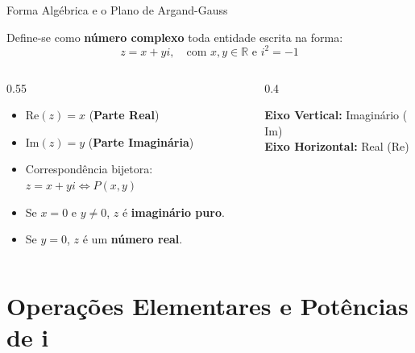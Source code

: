 \documentclass[10pt, aspectratio=169]{beamer}
\begin{document}
\begin{frame}{Forma Algébrica e o Plano de Argand-Gauss}
  \begin{definition}
    Define-se como \textbf{número complexo} toda entidade escrita na forma:
    \[
    z = x + yi, \quad \text{com } x, y \in \mathbb{R} \text{ e } i^2 = -1
    \]
  \end{definition}

  \begin{columns}
    \begin{column}{0.55\textwidth}
      \begin{itemize}
        \item $\text{Re}(z) = x$ \quad (\textbf{Parte Real})
        \item $\text{Im}(z) = y$ \quad (\textbf{Parte Imaginária})
        \item Correspondência bijetora: $z = x+yi \iff P(x, y)$
        \item Se $x = 0$ e $y \neq 0$, $z$ é \textbf{imaginário puro}.
        \item Se $y = 0$, $z$ é um \textbf{número real}.
      \end{itemize}
    \end{column}
    
    \begin{column}{0.4\textwidth}
      \begin{tcolorbox}[colback=bglight, colframe=secondary, title=\centering Plano Argand-Gauss, fonttitle=\small\bfseries]
        \centering
        \small
        \textbf{Eixo Vertical:} Imaginário ($\text{Im}$) \\
        \vspace{0.2cm}
        \textbf{Eixo Horizontal:} Real ($\text{Re}$)
      \end{tcolorbox}
    \end{column}
  \end{columns}
\end{frame}

\section{Operações Elementares e Potências de i}
\end{document}
